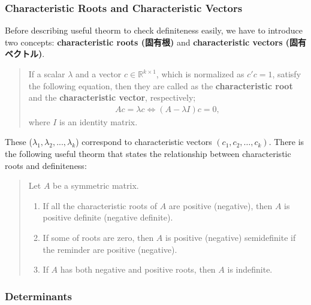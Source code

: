 \documentclass[
  12pt,
]{article}
\providecommand{\tightlist}{%
  \setlength{\itemsep}{0pt}\setlength{\parskip}{0pt}}
\begin{document}
\hypertarget{characteristic-roots-and-characteristic-vectors}{%
\subsubsection{Characteristic Roots and Characteristic
Vectors}\label{characteristic-roots-and-characteristic-vectors}}

Before describing useful theorm to check definiteness easily, we have to
introduce two concepts: \textbf{characteristic roots (固有根)} and
\textbf{characteristic vectors (固有ベクトル)}.

\begin{quote}
If a scalar \(\lambda\) and a vector \(c\in \mathbb{R}^{k \times 1}\),
which is normalized as \(c'c=1\), satisfy the following equation, then
they are called as the \textbf{characteristic root} and the
\textbf{characteristic vector}, respectively; \begin{align*}
Ac=\lambda c \Leftrightarrow (A-\lambda I)c = 0,
\end{align*} where \(I\) is an identity matrix.
\end{quote}

These (\(\lambda_1,\lambda _2,...,\lambda _k\)) correspond to
characteristic vectors \((c_1, c_2, \dots ,c_k)\). There is the
following useful theorm that states the relationship between
characteristic roots and definiteness:

\begin{quote}
Let \(A\) be a symmetric matrix.

\begin{enumerate}
\def\labelenumi{\arabic{enumi}.}
\tightlist
\item
  If all the characteristic roots of \(A\) are positive (negative), then
  \(A\) is positive definite (negative definite).
\item
  If some of roots are zero, then \(A\) is positive (negative)
  semidefinite if the reminder are positive (negative).
\item
  If \(A\) has both negative and positive roots, then \(A\) is
  indefinite.
\end{enumerate}
\end{quote}

\hypertarget{determinants}{%
\subsubsection{Determinants}\label{determinants}}
\end{document}
